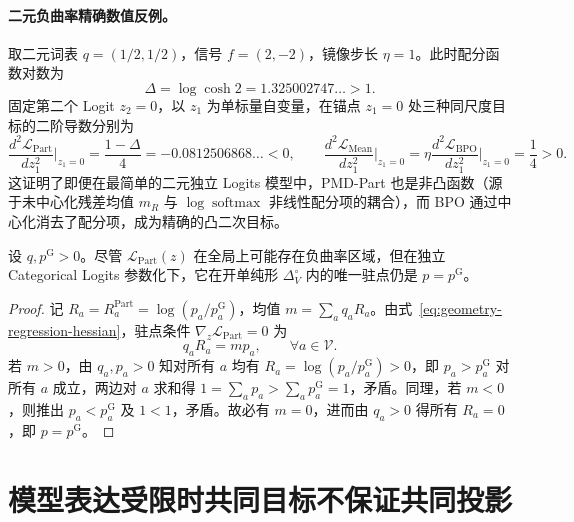 \documentclass[lang=cn,scheme=chinese,openany]{elegantbook}
\begin{document}
\paragraph{二元负曲率精确数值反例。}
取二元词表 $q=(1/2,1/2)$，信号 $f=(2,-2)$，镜像步长 $\eta=1$。此时配分函数对数为
\begin{equation}
\Delta=\log\cosh 2=1.325002747\ldots>1.
\end{equation}
固定第二个 Logit $z_2=0$，以 $z_1$ 为单标量自变量，在锚点 $z_1=0$ 处三种同尺度目标的二阶导数分别为
\begin{equation}
\frac{d^2\mathcal L_{\mathrm{Part}}}{dz_1^2}\bigg|_{z_1=0}
=\frac{1-\Delta}{4}=-0.0812506868\ldots<0,
\qquad
\frac{d^2\mathcal L_{\mathrm{Mean}}}{dz_1^2}\bigg|_{z_1=0}
=\eta\frac{d^2\mathcal L_{\mathrm{BPO}}}{dz_1^2}\bigg|_{z_1=0}=\frac14>0.
\end{equation}
这证明了即便在最简单的二元独立 Logits 模型中，PMD-Part 也是非凸函数（源于未中心化残差均值 $m_R$ 与 $\log\operatorname{softmax}$ 非线性配分项的耦合），而 BPO 通过中心化消去了配分项，成为精确的凸二次目标。

\begin{proposition}
\label{prop:geometry-part-stationary}
设 $q,p^{\mathrm G}>0$。尽管 $\mathcal L_{\mathrm{Part}}(z)$ 在全局上可能存在负曲率区域，但在独立 Categorical Logits 参数化下，它在开单纯形 $\Delta_V^\circ$ 内的唯一驻点仍是 $p=p^{\mathrm G}$。
\end{proposition}
\begin{proof}
记 $R_a=R_a^{\mathrm{Part}}=\log(p_a/p_a^{\mathrm G})$，均值 $m=\sum_a q_a R_a$。由式~\eqref{eq:geometry-regression-hessian}，驻点条件 $\nabla_z\mathcal L_{\mathrm{Part}}=0$ 为
\begin{equation}
q_a R_a=m p_a,\qquad \forall a\in\mathcal V.
\end{equation}
若 $m>0$，由 $q_a,p_a>0$ 知对所有 $a$ 均有 $R_a=\log(p_a/p_a^{\mathrm G})>0$，即 $p_a>p_a^{\mathrm G}$ 对所有 $a$ 成立，两边对 $a$ 求和得 $1=\sum_a p_a>\sum_a p_a^{\mathrm G}=1$，矛盾。同理，若 $m<0$，则推出 $p_a<p_a^{\mathrm G}$ 及 $1<1$，矛盾。故必有 $m=0$，进而由 $q_a>0$ 得所有 $R_a=0$，即 $p=p^{\mathrm G}$。
\end{proof}

\section{模型表达受限时共同目标不保证共同投影}
\label{sec:geometry-restricted}
\end{document}

